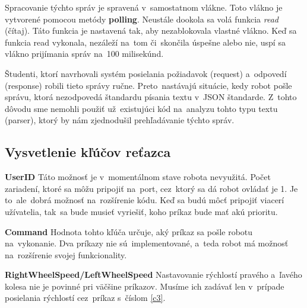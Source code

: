 	Spracovanie týchto správ je spravená v~samostatnom vlákne. Toto vlákno je vytvorené pomocou metódy \textbf{polling}.
	Neustále dookola sa volá funkcia \textit{read} (čítaj). Táto funkcia je nastavená tak, aby nezablokovala vlastné vlákno.
	Keď sa funkcia read vykonala, nezáleží na~tom či~skončila úspešne alebo nie, uspí sa vlákno prijímania správ na~100 milisekúnd.

	Študenti, ktorí navrhovali systém posielania požiadavok (request) a~odpovedí (response) robili tieto správy
	ručne. Preto~nastávajú situácie, kedy robot pošle správu, ktorá nezodpovedá štandardu písania textu v~JSON
	štandarde. Z~tohto dôvodu sme nemohli použiť už~existujúci kód na~analyzu tohto typu textu (parser), ktorý
	by nám zjednodušil prehľadávanie týchto správ.

\subsection{Vysvetlenie kľúčov reťazca}

\noindent \textbf{UserID} \newline
\indent Táto možnosť je v~momentálnom stave robota nevyužitá. Počet zariadení, ktoré sa môžu pripojiť na~port,
cez~ktorý sa dá robot ovládať je 1. Je to~ale~dobrá možnosť na~rozšírenie kódu. Keď sa budú môcť pripojiť
viacerí užívatelia, tak~sa bude musieť vyriešiť, koho príkaz bude mať akú prioritu. \newline

\noindent \textbf{Command} \newline
\indent Hodnota tohto kľúča určuje, aký príkaz sa pošle robotu na~vykonanie. Dva príkazy nie sú~implementované,
a~teda robot má možnosť na~rozšírenie svojej funkcionality. \newline

\noindent \textbf{RightWheelSpeed/LeftWheelSpeed} \newline
\indent Nastavovanie rýchlostí pravého a~ľavého kolesa nie je povinné pri väčšine príkazov. Musíme ich zadávať
len v~prípade posielania rýchlostí cez~príkaz s~číslom \ref{c3}.

